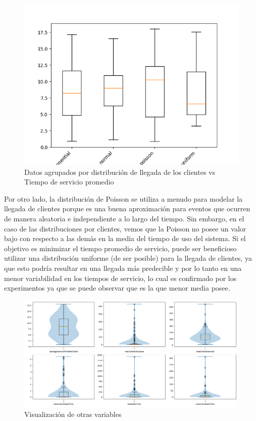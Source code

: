\documentclass[12pt]{article}
\begin{document}
\begin{figure}[H]
\centering
\includegraphics[width=1.2\textwidth]{tiempo x clientes.png}
\caption{Datos agrupados por distribución de llegada de los clientes vs Tiempo de servicio promedio}
\end{figure}

Por otro lado, la distribución de Poisson se utiliza a menudo para modelar la llegada de clientes porque es una buena aproximación para eventos que ocurren de manera aleatoria e independiente a lo largo del tiempo. Sin embargo,  en el caso de las distribuciones por clientes, vemos que la Poisson no posee un valor bajo con respecto a las demás en la media del tiempo de uso del sistema. Si el objetivo es minimizar el tiempo promedio de servicio, puede ser beneficioso utilizar una distribución uniforme (de ser posible) para la llegada de clientes, ya que esto podría resultar en una llegada más predecible y por lo tanto en una menor variabilidad en los tiempos de servicio, lo cual es confirmado por los experimentos ya que se puede observar que es la que menor media posee.

\begin{figure}[H]
\centering
\includegraphics[width=1.2\textwidth]{6.png}
\caption{Visualización de otras variables}
\end{figure}
\end{document}
